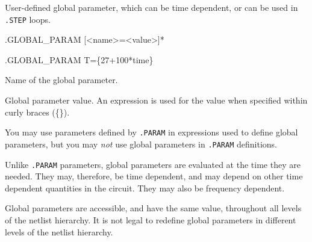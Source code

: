 


User-defined global parameter, which can be time dependent, or can be used in \texttt{.STEP} loops.

\begin{Command}

\format
.GLOBAL\_PARAM [<name>=<value>]*

\examples
.GLOBAL\_PARAM T=\{27+100*time\}

\begin{Arguments}
Name of the global parameter.

Global parameter value.  An expression is used for the value when specified within curly braces (\{\}).

\end{Arguments}

\comments

You may use parameters defined by \texttt{.PARAM} in expressions used to
define global parameters, but you may {\em not} use global parameters in
\texttt{.PARAM} definitions.

Unlike \texttt{.PARAM} parameters, global parameters are evaluated at
the time they are needed. They may, therefore, be time dependent, and may
depend on other time dependent quantities in the circuit.  They may also
be frequency dependent.

Global parameters are accessible, and have the same value, throughout all
levels of the netlist hierarchy.  It is not legal to redefine global parameters
in different levels of the netlist hierarchy.

\end{Command}
